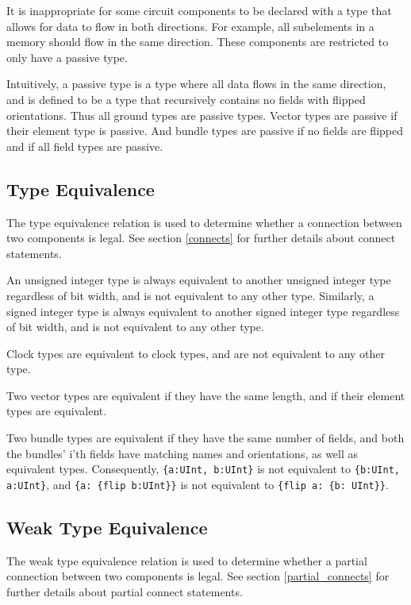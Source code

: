 \documentclass[12pt]{article}
\begin{document}
It is inappropriate for some circuit components to be declared with a type that allows for data to flow in both directions. For example, all subelements in a memory should flow in the same direction. These components are restricted to only have a passive type.

Intuitively, a passive type is a type where all data flows in the same direction, and is defined to be a type that recursively contains no fields with flipped orientations. Thus all ground types are passive types. Vector types are passive if their element type is passive. And bundle types are passive if no fields are flipped and if all field types are passive.

\subsection{Type Equivalence} \label{type_equivalence}

The type equivalence relation is used to determine whether a connection between two components is legal. See section \ref{connects} for further details about connect statements.

An unsigned integer type is always equivalent to another unsigned integer type regardless of bit width, and is not equivalent to any other type. Similarly, a signed integer type is always equivalent to another signed integer type regardless of bit width, and is not equivalent to any other type. 

Clock types are equivalent to clock types, and are not equivalent to any other type.

Two vector types are equivalent if they have the same length, and if their element types are equivalent.

Two bundle types are equivalent if they have the same number of fields, and both the bundles' i'th fields have matching names and orientations, as well as equivalent types. Consequently, \verb|{a:UInt, b:UInt}| is not equivalent to \verb|{b:UInt, a:UInt}|, and \verb|{a: {flip b:UInt}}| is not equivalent to \verb|{flip a: {b: UInt}}|.

\subsection{Weak Type Equivalence} \label{weak_type_equivalence}

The weak type equivalence relation is used to determine whether a partial connection between two components is legal. See section \ref{partial_connects} for further details about partial connect statements.
\end{document}

